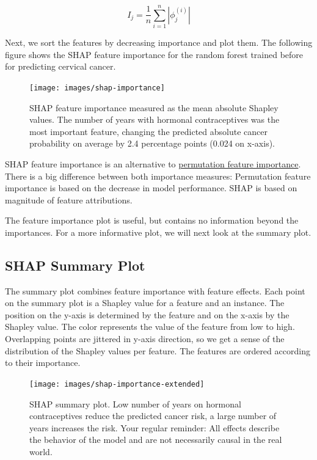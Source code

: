 \documentclass[
  10pt,
]{scrbook}
\begin{document}
\[I_j=\frac{1}{n}\sum_{i=1}^n{}|\phi_j^{(i)}|\]

Next, we sort the features by decreasing importance and plot them.
The following figure shows the SHAP feature importance for the random forest trained before for predicting cervical cancer.

\begin{figure}

{\centering \texttt{[image: images/shap-importance]} 

}

\caption{SHAP feature importance measured as the mean absolute Shapley values. The number of years with hormonal contraceptives was the most important feature, changing the predicted absolute cancer probability on average by 2.4 percentage points (0.024 on x-axis).}\label{fig:unnamed-chunk-45}
\end{figure}

SHAP feature importance is an alternative to \protect\hyperlink{feature-importance}{permutation feature importance}.
There is a big difference between both importance measures:
Permutation feature importance is based on the decrease in model performance.
SHAP is based on magnitude of feature attributions.

The feature importance plot is useful, but contains no information beyond the importances.
For a more informative plot, we will next look at the summary plot.

\hypertarget{shap-summary-plot}{%
\subsection{SHAP Summary Plot}\label{shap-summary-plot}}

The summary plot combines feature importance with feature effects.
Each point on the summary plot is a Shapley value for a feature and an instance.
The position on the y-axis is determined by the feature and on the x-axis by the Shapley value.
The color represents the value of the feature from low to high.
Overlapping points are jittered in y-axis direction, so we get a sense of the distribution of the Shapley values per feature.
The features are ordered according to their importance.

\begin{figure}

{\centering \texttt{[image: images/shap-importance-extended]} 

}

\caption{SHAP summary plot. Low number of years on hormonal contraceptives reduce the predicted cancer risk, a large number of years increases the risk. Your regular reminder: All effects describe the behavior of the model and are not necessarily causal in the real world.}\label{fig:unnamed-chunk-46}
\end{figure}
\end{document}
